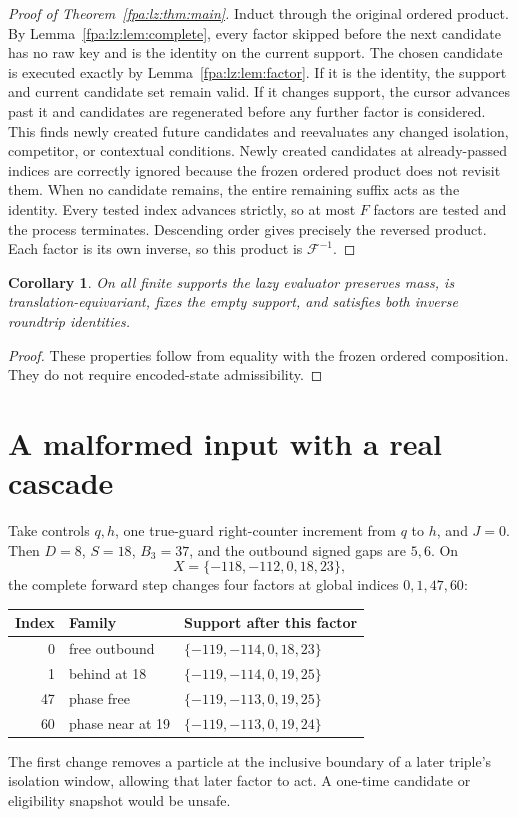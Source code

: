 \documentclass[11pt,a4paper]{article}
\numberwithin{equation}{section}
\newtheorem{corollary}[theorem]{Corollary}
\begin{document}
\begin{proof}[Proof of Theorem~\ref{fpa:lz:thm:main}]
Induct through the original ordered product. By Lemma~\ref{fpa:lz:lem:complete}, every factor skipped before the next candidate has no raw key and is the identity on the current support. The chosen candidate is executed exactly by Lemma~\ref{fpa:lz:lem:factor}. If it is the identity, the support and current candidate set remain valid. If it changes support, the cursor advances past it and candidates are regenerated before any further factor is considered. This finds newly created future candidates and reevaluates any changed isolation, competitor, or contextual conditions. Newly created candidates at already-passed indices are correctly ignored because the frozen ordered product does not revisit them. When no candidate remains, the entire remaining suffix acts as the identity. Every tested index advances strictly, so at most $F$ factors are tested and the process terminates. Descending order gives precisely the reversed product. Each factor is its own inverse, so this product is $\mathcal F^{-1}$.
\end{proof}

\begin{corollary}
On all finite supports the lazy evaluator preserves mass, is translation-equivariant, fixes the empty support, and satisfies both inverse roundtrip identities.
\end{corollary}
\begin{proof}
These properties follow from equality with the frozen ordered composition. They do not require encoded-state admissibility.
\end{proof}

\section{A malformed input with a real cascade}\label{fpa:lz:sec:cascade}
Take controls $q,h$, one true-guard right-counter increment from $q$ to $h$, and $J=0$. Then $D=8$, $S=18$, $B_3=37$, and the outbound signed gaps are $5,6$. On
\[
X=\{-118,-112,0,18,23\},
\]
the complete forward step changes four factors at global indices $0,1,47,60$:
\begin{center}
\begin{tabular}{@{}rlp{87mm}@{}}
\toprule
Index & Family & Support after this factor\\
\midrule
0 & free outbound & $\{-119,-114,0,18,23\}$\\
1 & behind at 18 & $\{-119,-114,0,19,25\}$\\
47 & phase free & $\{-119,-113,0,19,25\}$\\
60 & phase near at 19 & $\{-119,-113,0,19,24\}$\\
\bottomrule
\end{tabular}
\end{center}
The first change removes a particle at the inclusive boundary of a later triple's isolation window, allowing that later factor to act. A one-time candidate or eligibility snapshot would be unsafe.
\end{document}
